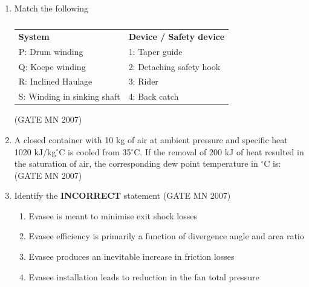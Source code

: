 \documentclass[journal]{IEEEtran}
\begin{document}
\begin{enumerate}
\item Match the following
\begin{table}[H]
    \centering\normalsize
\begin{tabular}{p{4.5cm} p{6cm}}
\textbf{System} & \textbf{Device / Safety device} \\
P: Drum winding & 1: Taper guide \\
Q: Koepe winding & 2: Detaching safety hook \\
R: Inclined Haulage & 3: Rider \\
S: Winding in sinking shaft & 4: Back catch \\
\end{tabular}
\caption{}
    \label{tab:Q48}
\end{table}
\hfill (GATE MN 2007)
\begin{enumerate}
\end{enumerate}


\item A closed container with 10 kg of air at ambient pressure and specific heat 1020 kJ/kg$^\circ$C is cooled from 35$^\circ$C. If the removal of 200 kJ of heat resulted in the saturation of air, the corresponding dew point temperature in $^\circ$C is:
\hfill (GATE MN 2007)
\begin{enumerate}
\end{enumerate}


\item Identify the \textbf{INCORRECT} statement
\hfill (GATE MN 2007)
\begin{enumerate}
\item Evasee is meant to minimise exit shock losses
\item Evasee efficiency is primarily a function of divergence angle and area ratio
\item Evasee produces an inevitable increase in friction losses
\item Evasee installation leads to reduction in the fan total pressure
\end{enumerate}



\end{enumerate}
\end{document}
